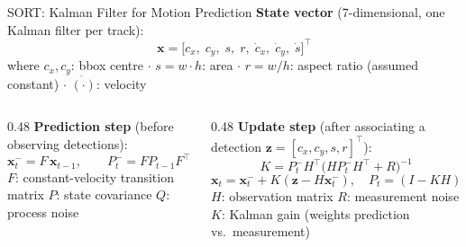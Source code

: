 \documentclass[aspectratio=169]{beamer}
\begin{document}
\begin{frame}{SORT: Kalman Filter for Motion Prediction}
  \textbf{State vector} (7-dimensional, one Kalman filter per track):
  \[
    \mathbf{x} = \bigl[c_x,\; c_y,\; s,\; r,\; \dot{c}_x,\; \dot{c}_y,\; \dot{s}\bigr]^\top
  \]
  where $c_x, c_y$: bbox centre $\cdot$ $s = w \cdot h$: area $\cdot$
  $r = w/h$: aspect ratio (assumed constant) $\cdot$ $\dot{(\cdot)}$: velocity

  \begin{columns}[T]
    \begin{column}{0.48\textwidth}
      \textbf{Prediction step} (before observing detections):
      \[
        \mathbf{x}^-_t = F\,\mathbf{x}_{t-1}, \qquad
        P^-_t = F P_{t-1} F^\top + Q
      \]
      $F$: constant-velocity transition matrix \quad
      $P$: state covariance \quad $Q$: process noise
    \end{column}
    \begin{column}{0.48\textwidth}
      \textbf{Update step} (after associating a detection $\mathbf{z}=[c_x,c_y,s,r]^\top$):
      \[
        K = P^-_t H^\top\!\bigl(H P^-_t H^\top + R\bigr)^{-1}
      \]
      \[
        \mathbf{x}_t = \mathbf{x}^-_t + K\!\left(\mathbf{z} - H\mathbf{x}^-_t\right),
        \quad P_t = (I - KH)\,P^-_t
      \]
      $H$: observation matrix \quad $R$: measurement noise \quad
      $K$: Kalman gain (weights prediction vs.\ measurement)
    \end{column}
  \end{columns}
  \vspace{0.2em}
\end{frame}
\end{document}
